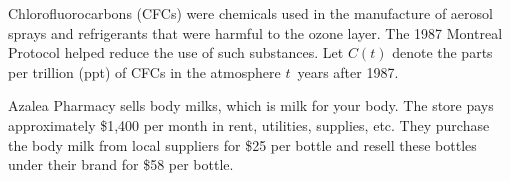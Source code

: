 \documentclass[12pt,letterpaper]{exam}
\begin{document}
\begin{questions}
\newpage
\question Chlorofluorocarbons (CFCs) were chemicals used in the manufacture of aerosol sprays and refrigerants that were harmful to the ozone layer. The 1987 Montreal Protocol helped reduce the use of such substances. Let $C(t)$ denote the parts per trillion (ppt) of CFCs in the atmosphere $t$~years after 1987. 



\newpage
\question Azalea Pharmacy sells body milks, which is milk for your body. The store pays approximately \$1,400 per month in rent, utilities, supplies, etc. They purchase the body milk from local suppliers for \$25 per bottle and resell these bottles under their brand for \$58 per bottle. 
\end{questions}
\end{document}
